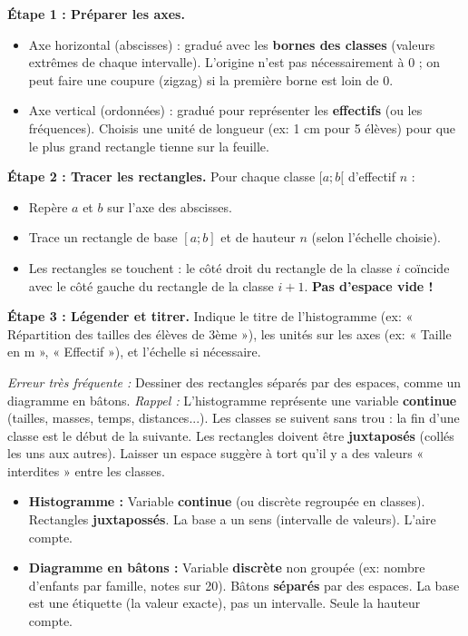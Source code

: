 \documentclass[11pt]{article}
\begin{document}
\begin{methode}
\textbf{Étape 1 : Préparer les axes.}
\begin{itemize}
    \item Axe horizontal (abscisses) : gradué avec les \textbf{bornes des classes} (valeurs extrêmes de chaque intervalle). L'origine n'est pas nécessairement à 0 ; on peut faire une coupure (zigzag) si la première borne est loin de 0.
    \item Axe vertical (ordonnées) : gradué pour représenter les \textbf{effectifs} (ou les fréquences). Choisis une unité de longueur (ex: 1 cm pour 5 élèves) pour que le plus grand rectangle tienne sur la feuille.
\end{itemize}

\textbf{Étape 2 : Tracer les rectangles.}
Pour chaque classe $[a ; b[$ d'effectif $n$ :
\begin{itemize}
    \item Repère $a$ et $b$ sur l'axe des abscisses.
    \item Trace un rectangle de base $[a ; b]$ et de hauteur $n$ (selon l'échelle choisie).
    \item Les rectangles se touchent : le côté droit du rectangle de la classe $i$ coïncide avec le côté gauche du rectangle de la classe $i+1$. \textbf{Pas d'espace vide !}
\end{itemize}

\textbf{Étape 3 : Légender et titrer.}
Indique le titre de l'histogramme (ex: « Répartition des tailles des élèves de 3ème »), les unités sur les axes (ex: « Taille en m », « Effectif »), et l'échelle si nécessaire.
\end{methode}

\begin{attention}
\emph{Erreur très fréquente :} Dessiner des rectangles séparés par des espaces, comme un diagramme en bâtons.
\emph{Rappel :} L'histogramme représente une variable \textbf{continue} (tailles, masses, temps, distances...). Les classes se suivent sans trou : la fin d'une classe est le début de la suivante. Les rectangles doivent être \textbf{juxtaposés} (collés les uns aux autres). Laisser un espace suggère à tort qu'il y a des valeurs « interdites » entre les classes.
\end{attention}

\begin{attention}
\begin{itemize}
    \item \textbf{Histogramme :} Variable \textbf{continue} (ou discrète regroupée en classes). Rectangles \textbf{juxtapossés}. La base a un sens (intervalle de valeurs). L'aire compte.
    \item \textbf{Diagramme en bâtons :} Variable \textbf{discrète} non groupée (ex: nombre d'enfants par famille, notes sur 20). Bâtons \textbf{séparés} par des espaces. La base est une étiquette (la valeur exacte), pas un intervalle. Seule la hauteur compte.
\end{itemize}
\end{attention}
\end{document}
